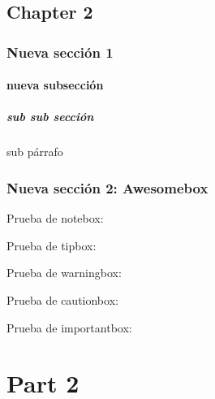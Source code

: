 \documentclass{yukibook}
\begin{document}
\chapter{Chapter 2}
\Blindtext[1]

\section{Nueva sección 1}
\Blindtext[1]

\subsection{nueva subsección}
\Blindtext[1]

\subsubsection{sub sub sección}
\Blindtext[1]

\subparagraph{sub párrafo}
\Blindtext[1]

\section{Nueva sección 2: Awesomebox}
Prueba de notebox:

\notebox{\Blindtext[1]}

Prueba de tipbox:
\tipbox{\Blindtext[1]}

Prueba de warningbox:
\warningbox{\Blindtext[1]}

Prueba de cautionbox:
\cautionbox{\Blindtext[1]}

Prueba de importantbox:
\importantbox{\Blindtext[1]}


\begin{info-box}
  \notebox{\Blindtext[1]}
\end{info-box}
\begin{warning-box}
  \Blindtext[1]
\end{warning-box}
\begin{error-box}
  \Blindtext[1]
\end{error-box}


\part{Part 2}
\Blinddocument
\end{document}
